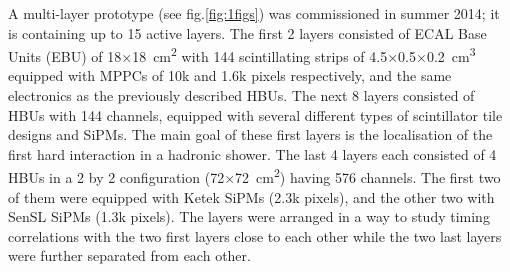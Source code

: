 A multi-layer prototype (see fig.\ref{fig:1figs}) was commissioned in summer 2014; it is containing up to 15 active layers. The first 2 layers consisted of ECAL Base Units (EBU) of 18$\times$\SI{18}{\square\centi\metre} with 144 scintillating strips of 4.5$\times$0.5$\times$\SI{0.2}{\cubic\centi\metre} equipped with MPPCs of 10k and 1.6k pixels respectively, and the same electronics as the previously described HBUs. The next 8 layers consisted of HBUs with 144 channels, equipped with several different types of scintillator tile designs and SiPMs. The main goal of these first layers is the localisation of the first hard interaction in a hadronic shower. The last 4 layers each consisted of 4 HBUs in a 2 by 2 configuration (72$\times$\SI{72}{\square\centi\metre}) having 576 channels. The first two of them were equipped with Ketek SiPMs (2.3k pixels), and the other two with SenSL SiPMs (1.3k pixels). The layers were arranged in a way to study timing correlations with the two first layers close to each other while the two last layers were further separated from each other.

